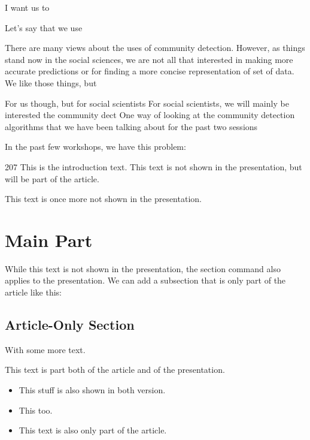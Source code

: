 I want us to 



Let's say that we use 




There are many views about the uses of community detection. However,
as things stand now in the social sciences, we are not all that
interested in making more accurate predictions or for finding a more
concise representation of set of data. We like those things, but 

For us though,  but for social scientists
For social scientists, we will mainly be interested the community dect
One way of looking at the community detection algorithms that we have been talking about for the past two sessions

In the past few workshops, we have  this problem:




207
This is the introduction text. This text is not shown in the
presentation, but will be part of the article.

This text is once more not shown in the presentation.
\section{Main Part}
While this text is not shown in the presentation, the section command
also applies to the presentation.
We can add a subsection that is only part of the article like this:
\subsection<article>{Article-Only Section}
With some more text.
\begin{frame}
This text is part both of the article and of the presentation.
\begin{itemize}
\item This stuff is also shown in both version.
\item This too.
\item<presentation:only@0> This text is also only part of the article.
\end{itemize}
\end{frame}

